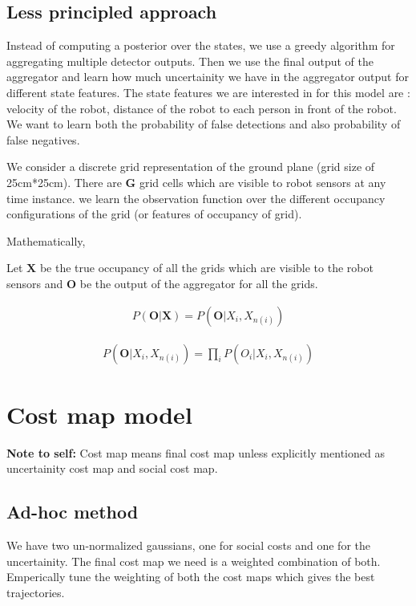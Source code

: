 \documentclass[11pt]{article}
\begin{document}
\subsection{Less principled approach}

Instead of computing a posterior over the states, we use a greedy algorithm for aggregating multiple detector outputs. Then we use the final output of the aggregator and learn how much uncertainity we have in the aggregator output for different state features. The state features we are interested in for this model are :
velocity of the robot, distance of the robot to each person in front of the robot. We want to learn both the probability of false detections and also probability of false negatives. 

We consider a discrete grid representation of the ground plane (grid size of 25cm*25cm). There are $\textbf{G}$ grid cells which are visible to robot sensors at any time instance. we learn the observation function over the different occupancy configurations of the grid (or features of occupancy of grid).  

Mathematically,

Let $\textbf{X}$ be the true occupancy of all the grids which are visible to the robot sensors and $\textbf{O}$ be the output of the aggregator for all the grids.

\begin{align}
P(\textbf{O}|\textbf{X}) = P(\textbf{O}|X_{i},X_{n(i)}) 
\end{align}

\begin{align}
P(\textbf{O}|X_{i},X_{n(i)}) = \prod_{i} P(O_{i}|X_{i},X_{n(i)})
\end{align}

\section{Cost map model}

\textbf{Note to self:} Cost map means final cost map unless explicitly mentioned as uncertainity cost map and social cost map.

\subsection{Ad-hoc method}

We have two un-normalized gaussians, one for social costs and one for the uncertainity. The final cost map we need is a weighted combination of both. Emperically tune the weighting of both the cost maps which gives the best trajectories.
\end{document}
